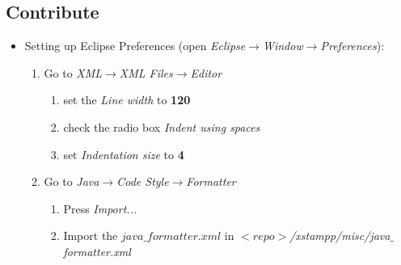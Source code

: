 \subsection{Contribute}
\begin{itemize}
\item Setting up Eclipse Preferences (open \textit{Eclipse}$\rightarrow$\textit{Window}$\rightarrow$\textit{Preferences}):
\begin{enumerate}
	\item Go to \textit{XML}$\rightarrow$\textit{XML Files}$\rightarrow$\textit{Editor}
	\begin{enumerate}
		\item set the \textit{Line width} to \textbf{120}
		\item check the radio box \textit{Indent using spaces}
		\item set \textit{Indentation size} to \textbf{4}
	\end{enumerate}
	\item Go to \textit{Java}$\rightarrow$\textit{Code Style}$\rightarrow$\textit{Formatter}
	\begin{enumerate}
		\item Press \textit{Import...}
		\item Import the $java\_formatter.xml$ in $<repo>$\textit{/xstampp/misc/java}$\_$\textit{formatter.xml}
	\end{enumerate}
\end{enumerate}
\end{itemize}
